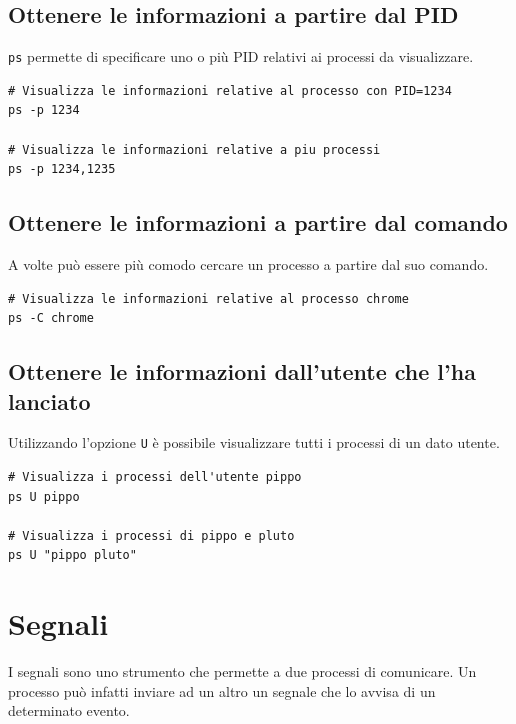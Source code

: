 \documentclass[a4paper]{report}
\newenvironment{code}{\begin{tcolorbox}[size=small]}{\end{tcolorbox}}
\begin{document}
\subsection{Ottenere le informazioni a partire dal PID}

\texttt{ps} permette di specificare uno o più PID relativi ai processi da visualizzare.
\begin{code}
\begin{lstlisting}
# Visualizza le informazioni relative al processo con PID=1234
ps -p 1234

# Visualizza le informazioni relative a piu processi
ps -p 1234,1235
\end{lstlisting}
\end{code}

\subsection{Ottenere le informazioni a partire dal comando}

A volte può essere più comodo cercare un processo a partire dal suo comando.
\begin{code}
\begin{lstlisting}
# Visualizza le informazioni relative al processo chrome
ps -C chrome
\end{lstlisting}
\end{code}

\subsection{Ottenere le informazioni dall'utente che l'ha lanciato}

Utilizzando l'opzione \texttt{U} è possibile visualizzare tutti i processi di un dato utente.
\begin{code}
	\begin{lstlisting}
# Visualizza i processi dell'utente pippo
ps U pippo

# Visualizza i processi di pippo e pluto
ps U "pippo pluto"
	\end{lstlisting}
\end{code}

\section{Segnali}

I segnali sono uno strumento che permette a due processi di comunicare. Un processo può infatti inviare ad un altro un segnale che lo avvisa di un determinato evento.
\end{document}
